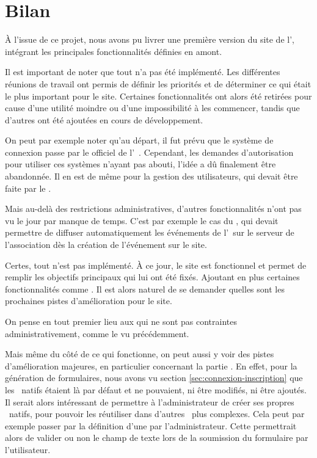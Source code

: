 \chapter{Bilan}

À l’issue de ce projet, nous avons pu livrer une première version du site de l'\ofni, intégrant les principales fonctionnalités définies en amont.
\bigskip

Il est important de noter que tout n'a pas été implémenté. Les différentes réunions de travail ont permis de définir les priorités et de déterminer ce qui était le plus important pour le site. Certaines fonctionnalités ont alors été retirées pour cause d'une utilité moindre ou d'une impossibilité à les commencer, tandis que d'autres ont été ajoutées en cours de développement.

On peut par exemple noter qu'au départ, il fut prévu que le système de connexion passe par le  officiel de l'\univ\ . Cependant, les demandes d'autorisation pour utiliser ces systèmes n'ayant pas abouti, l'idée a dû finalement être abandonnée. Il en est de même pour la gestion des utilisateurs, qui devait être faite par le .

Mais au-delà des restrictions administratives, d'autres fonctionnalités n'ont pas vu le jour par manque de temps. C'est par exemple le cas du , qui devait permettre de diffuser automatiquement les événements de l'\ofni\ sur le serveur  de l'association dès la création de l'événement sur le site.
\bigskip

Certes, tout n'est pas implémenté. À ce jour, le site est fonctionnel et permet de remplir les objectifs principaux qui lui ont été fixés. Ajoutant en plus certaines fonctionnalités comme \game. Il est alors naturel de se demander quelles sont les prochaines pistes d'amélioration pour le site.

On pense en tout premier lieu aux  qui ne sont pas contraintes administrativement, comme le  vu précédemment.

Mais même du côté de ce qui fonctionne, on peut aussi y voir des pistes d'amélioration majeures, en particulier concernant la partie . En effet, pour la génération de formulaires, nous avons vu section \ref{sec:connexion-inscription} que les \formwidget\ natifs étaient là par défaut et ne pouvaient, ni être modifiés, ni être ajoutés. Il serait alors intéressant de permettre à l'administrateur de créer ses propres \formwidget\ natifs, pour pouvoir les réutiliser dans d'autres \formwidget\ plus complexes. Cela peut par exemple passer par la définition d'une  par l'administrateur. Cette  permettrait alors de valider ou non le champ de texte lors de la soumission du formulaire par l'utilisateur.


